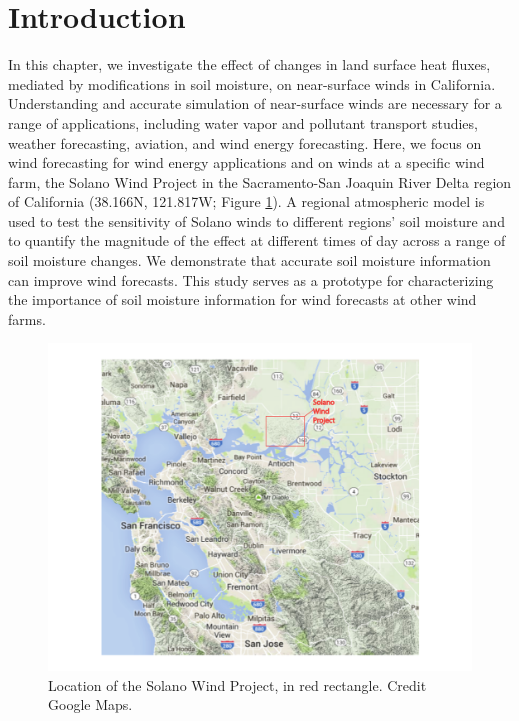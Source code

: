 
%
%
%
%
%

\section{Introduction}

In this chapter, we investigate the effect of changes in land surface heat fluxes, mediated by modifications in soil moisture, on near-surface winds in California.  Understanding and accurate simulation of near-surface winds are necessary for a range of applications, including water vapor and pollutant transport studies, weather forecasting, aviation, and wind energy forecasting.  Here, we focus on wind forecasting for wind energy applications and on winds at a specific wind farm, the Solano Wind Project in the Sacramento-San Joaquin River Delta region of California (38.166N, 121.817W; Figure \ref{fig:windSol_solanomap}).  A regional atmospheric model is used to test the sensitivity of Solano winds to different regions' soil moisture and to quantify the magnitude of the effect at different times of day across a range of soil moisture changes.  We demonstrate that accurate soil moisture information can improve wind forecasts.  This study serves as a prototype for characterizing the importance of soil moisture information for wind forecasts at other wind farms.

\begin{figure}[here]
\includegraphics[width=1\textwidth]{ch3-wind/img/solano_map.pdf}
\caption{Location of the Solano Wind Project, in red rectangle.  Credit Google Maps.}
\label{fig:windSol_solanomap}
\end{figure}

